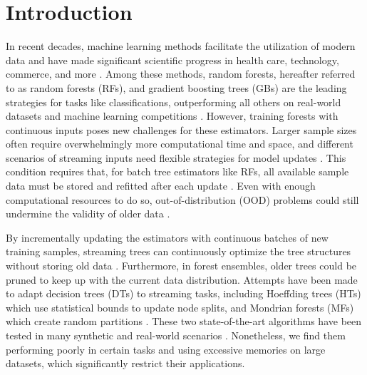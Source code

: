 \section{Introduction}
\label{introduction}
In recent decades, machine learning methods facilitate the utilization of modern data and have made significant scientific progress in health care, technology, commerce, and more \citep{jordan_machine_2015}. 
Among these methods, random forests, hereafter referred to as random forests (RFs), and gradient boosting trees (GBs) are the leading strategies for tasks like classifications, outperforming all others on real-world datasets and machine learning competitions \citep{breiman_random_2001, friedman_greedy_2001, caruana_empirical_2006, caruana_empirical_2008, fernandez-delgado_we_2014, chen_xgboost_2016}.
However, training forests with continuous inputs poses new challenges for these estimators.
Larger sample sizes often require overwhelmingly more computational time and space, and different scenarios of streaming inputs need flexible strategies for model updates \citep{liu_isolation_2008, abdulsalam_streaming_2007}. This condition requires that, for batch tree estimators like RFs, all available sample data must be stored and refitted after each update \citep{amit_shape_1997, breiman_random_2001}. Even with enough computational resources to do so, out-of-distribution (OOD) problems could still undermine the validity of older data \citep{geisa_towards_2021}. 

By incrementally updating the estimators with continuous batches of new training samples, streaming trees can continuously optimize the tree structures without storing old data \citep{domingos_mining_2000, bifet_adaptive_2009, lakshminarayanan_mondrian_2014, ben-haim_streaming_2010}. Furthermore, in forest ensembles, older trees could be pruned to keep up with the current data distribution. Attempts have been made to adapt decision trees (DTs) to streaming tasks, including Hoeffding trees (HTs) which use statistical bounds to update node splits, and Mondrian forests (MFs) which create random partitions \citep{domingos_mining_2000, lakshminarayanan_mondrian_2014}. These two state-of-the-art algorithms have been tested in many synthetic and real-world scenarios \citep{pfahringer_new_2007, gomes_machine_2019, lakshminarayanan_mondrian_2016, khannouz_benchmark_2020}. Nonetheless, we find them performing poorly in certain tasks and using excessive memories on large datasets, which significantly restrict their applications.

